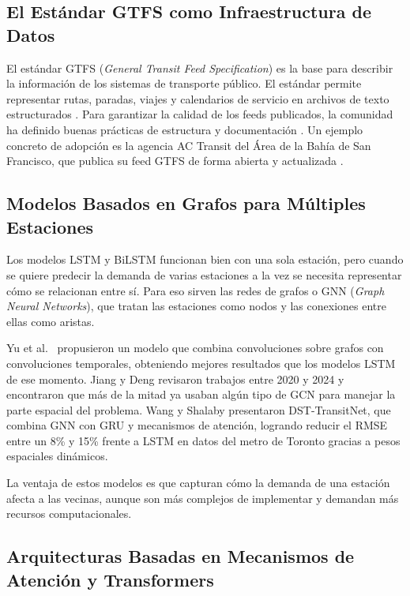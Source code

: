 \documentclass[preprint,12pt]{elsarticle}
\begin{document}
\subsection{El Estándar GTFS como Infraestructura de Datos}

El estándar GTFS (\textit{General Transit Feed Specification}) \cite{gtfs_home} es la base para describir la información de los sistemas de transporte público. El estándar permite representar rutas, paradas, viajes y calendarios de servicio en archivos de texto estructurados \cite{gtfs_using, gtfs_sharing}. Para garantizar la calidad de los feeds publicados, la comunidad ha definido buenas prácticas de estructura y documentación \cite{gtfs_bestpractices, tumi_gtfs}. Un ejemplo concreto de adopción es la agencia AC Transit del Área de la Bahía de San Francisco, que publica su feed GTFS de forma abierta y actualizada \cite{actransit_gtfs}.

\subsection{Modelos Basados en Grafos para Múltiples Estaciones}

Los modelos LSTM y BiLSTM funcionan bien con una sola estación, pero cuando se quiere predecir la demanda de varias estaciones a la vez se necesita representar cómo se relacionan entre sí. Para eso sirven las redes de grafos o GNN (\textit{Graph Neural Networks}), que tratan las estaciones como nodos y las conexiones entre ellas como aristas.

Yu et al.\ \cite{yu2018} propusieron un modelo que combina convoluciones sobre grafos con convoluciones temporales, obteniendo mejores resultados que los modelos LSTM de ese momento. Jiang y Deng \cite{jiang2022} revisaron trabajos entre 2020 y 2024 y encontraron que más de la mitad ya usaban algún tipo de GCN para manejar la parte espacial del problema. Wang y Shalaby \cite{wang2024} presentaron DST-TransitNet, que combina GNN con GRU y mecanismos de atención, logrando reducir el RMSE entre un 8\% y 15\% frente a LSTM en datos del metro de Toronto gracias a pesos espaciales dinámicos.

La ventaja de estos modelos es que capturan cómo la demanda de una estación afecta a las vecinas, aunque son más complejos de implementar y demandan más recursos computacionales.

\subsection{Arquitecturas Basadas en Mecanismos de Atención y Transformers}
\end{document}
